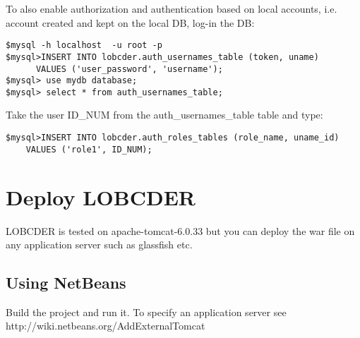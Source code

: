\documentclass[a4paper,10pt]{article}
\begin{document}
To also enable authorization and authentication based on local accounts, i.e. account created and kept on the local DB, log-in the DB: 
\begin{lstlisting}
$mysql -h localhost  -u root -p
$mysql>INSERT INTO lobcder.auth_usernames_table (token, uname) 
      VALUES ('user_password', 'username');
$mysql> use mydb database;
$mysql> select * from auth_usernames_table;
\end{lstlisting}

Take the user ID\_NUM from the auth\_usernames\_table table and type:
\begin{lstlisting}
$mysql>INSERT INTO lobcder.auth_roles_tables (role_name, uname_id)
    VALUES ('role1', ID_NUM);
\end{lstlisting}

\section{Deploy LOBCDER}

LOBCDER is tested on apache-tomcat-6.0.33 but you can deploy the war file on any application server such as glassfish etc. 

\subsection{Using NetBeans}
Build the project and run it. To specify an application server see http://wiki.netbeans.org/AddExternalTomcat
\end{document}
